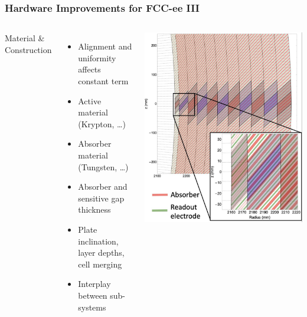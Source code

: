 \documentclass[aspectratio=169]{beamer}
\newcommand{\bluetext}[1]{%
  \textcolor{myBlue}{#1}
}
\begin{document}
\begin{frame}
  \frametitle{Hardware Improvements for FCC-ee III}

  \begin{columns}[c]

    \bluetext{Material \& Construction}
    \begin{itemize}
      \item Alignment and uniformity affects constant term
      \item Active material (Krypton, \dots)
      \item Absorber material (Tungsten, \dots)
      \item Absorber and sensitive gap thickness
      \item Plate inclination, layer depths, cell merging
      \item Interplay between sub-systems
    \end{itemize}


    \begin{center}
      \includegraphics[width=0.7\linewidth]{figures/fcc-lar-segmentation.png}
    \end{center}
  \end{columns}
\end{frame}
\end{document}

